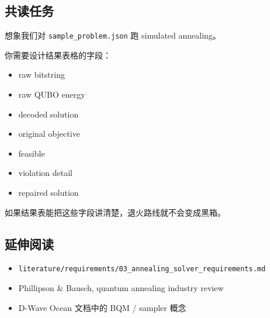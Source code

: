 \documentclass[UTF8,12pt,a4paper]{ctexart}
\begin{document}
\subsection*{共读任务}

想象我们对 \texttt{sample\_problem.json} 跑 simulated annealing。

你需要设计结果表格的字段：

\begin{itemize}
\item raw bitstring
\item raw QUBO energy
\item decoded solution
\item original objective
\item feasible
\item violation detail
\item repaired solution
\end{itemize}

如果结果表能把这些字段讲清楚，退火路线就不会变成黑箱。

\subsection*{延伸阅读}

\begin{itemize}
\item \texttt{literature/requirements/03\_annealing\_solver\_requirements.md}
\item Phillipson \& Bausch, quantum annealing industry review
\item D-Wave Ocean 文档中的 BQM / sampler 概念
\end{itemize}
\end{document}
